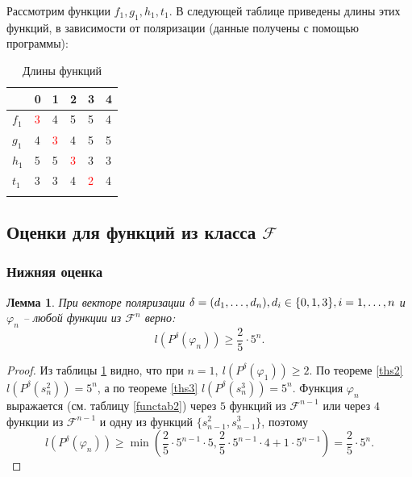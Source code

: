 \documentclass[bibliography=totoc, a4paper, 14pt]{extarticle}
\newtheorem{mylm}{Лемма}
\newcommand{\pphi}[1] {P^{\delta}(\varphi_{#1})}
\def\in{\mathchar"3232\nobreak\discretionary{}{\usefont{OMS}{cmsy}{m}{n}\char50}{}}
\begin{document}
Рассмотрим функции $f_1, g_1, h_1, t_1$. В следующей таблице приведены длины этих функций,
в зависимости от поляризации (данные получены с помощью программы):
\begin{center}
\begin{longtable}{| l | l | l | l | l | l |}

\hline & 0 & 1 & 2 & 3 & 4 \\
\hline

$f_1$ & \textcolor{red}{3} & 4 & 5 & 5 & 4
\\ \hline

$g_1$ & 4 & \textcolor{red}{3} & 4 & 5 & 5
\\ \hline

$h_1$ & 5 & 5 & \textcolor{red}{3} & 3 & 3
\\ \hline

$t_1$ & 3 & 3 & 4 & \textcolor{red}{2} & 4
\\ \hline

\caption{Длины функций}
\label{tab1}
\end{longtable}
\end{center}

\subsection{Оценки для функций из класса $\mathcal{F}$}
\subsubsection{Нижняя оценка}
\begin{mylm}
При векторе поляризации $\delta = (d_1,\dots,d_n), d_i \in \{0,1,3\}, i = 1,\dots,n$ и
$\varphi_n$ -- любой функции из $\mathcal{F}^n$ верно:
$$l(\pphi{n}) \geqslant \frac{2}{5} \cdot 5^n.$$
\end{mylm}
\begin{proof}
Из таблицы \ref{tab1} видно, что при $n=1,\ l(\pphi{1}) \geqslant 2$.
По теореме \ref{ths2} $l(P^{\delta}(s^2_n)) = 5^n$, а по теореме \ref{ths3}
$l(P^{\delta}(s^3_n)) = 5^n$. Функция $\varphi_n$ выражается (см. таблицу \ref{functab2}) через $5$
функций из $\mathcal{F}^{n-1}$ или через $4$ функции из $\mathcal{F}^{n-1}$ и одну из функций
$\{s^2_{n-1}, s^3_{n-1}\}$, поэтому
$${l(\pphi{n})\geqslant\min(\frac{2}{5}\cdot5^{n-1}\cdot5,\frac{2}{5}\cdot5^{n-1}\cdot4+1
    \cdot5^{n-1})} = \frac{2}{5}\cdot5^n.$$
\end{proof}
\end{document}
